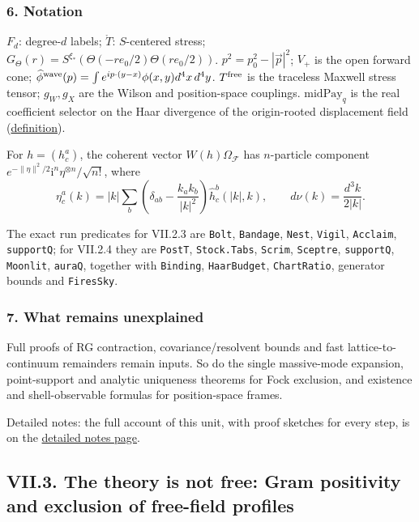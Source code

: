 \documentclass[
  letterpaper,
  11pt]{article}
\begin{document}
\subsubsection{6. Notation}\label{notation-26}

\(F_d\): degree-\(d\) labels; \(\mathring T\): \(S\)-centered stress;
\(G_\Theta(r)=S^{\xi_*}(\Theta(-re_0/2)\Theta(re_0/2))\).
\(p^2=p_0^2-|\vec p|^2\); \(V_+\) is the open forward cone;
\(\widehat\phi^{\rm wave}(p)=\int e^{ip\cdot(y-x)}\phi(x,y)d^4x\,d^4y\).
\(T^{\rm free}\) is the traceless Maxwell stress tensor; \(g_W,g_X\) are
the Wilson and position-space couplings. \(\mathrm{midPay}_q\) is the
real coefficient selector on the Haar divergence of the origin-rooted
displacement field
(\href{https://github.com/yang-mills-group/OpenAI-YM-20261028/blob/3456e5e75cf8d4cd558955a5c7638fba2d68f464/YM/TraceExtension/Loft/Leaf.lean\#L38}{definition}).

For \(h=(h_c^a)\), the coherent vector \(W(h)\Omega_{\mathcal F}\) has
\(n\)-particle component
\(e^{-\|\eta\|^2/2}\mathrm{i}^n\eta^{\otimes n}/\sqrt{n!}\), where
\[\eta_c^a(k)=|k|\sum_b\left(\delta_{ab}-\frac{k_ak_b}{|k|^2}\right)\widehat h_c^b(|k|,k),\qquad d\nu(k)=\frac{d^3k}{2|k|}.\]

The exact run predicates for VII.2.3 are \texttt{Bolt},
\texttt{Bandage}, \texttt{Nest}, \texttt{Vigil}, \texttt{Acclaim},
\texttt{supportQ}; for VII.2.4 they are \texttt{PostT},
\texttt{Stock.Tabs}, \texttt{Scrim}, \texttt{Sceptre},
\texttt{supportQ}, \texttt{Moonlit}, \texttt{auraQ}, together with
\texttt{Binding}, \texttt{HaarBudget}, \texttt{ChartRatio}, generator
bounds and \texttt{FiresSky}.

\subsubsection{7. What remains
unexplained}\label{what-remains-unexplained-26}

Full proofs of RG contraction, covariance/resolvent bounds and fast
lattice-to-continuum remainders remain inputs. So do the single
massive-mode expansion, point-support and analytic uniqueness theorems
for Fock exclusion, and existence and shell-observable formulas for
position-space frames.

Detailed notes: the full account of this unit, with proof sketches for
every step, is on the
\href{https://github.com/scottnarmstrong/yang-mills-informalization/blob/main/outline/notes/VII-2.md}{detailed
notes page}.

\subsection{VII.3. The theory is not free: Gram positivity and exclusion
of free-field
profiles}\label{vii.3.-the-theory-is-not-free-gram-positivity-and-exclusion-of-free-field-profiles}
\end{document}
